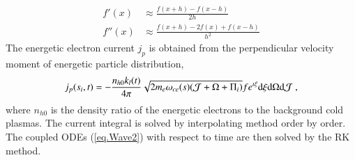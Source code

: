 \begin{equation}
    \begin{aligned}
    f'(x) &\approx \frac{f(x + h) - f(x - h)}{2h}\\
    f''(x) &\approx \frac{f(x + h) - 2f(x) + f(x - h)}{h^2}
    \end{aligned}
\end{equation}
The energetic electron
current $j_p$ is obtained from the perpendicular velocity moment of energetic particle distribution,
\begin{equation}
    j_p(s_i,t) = - \frac{n_{h0}k_l(t)}{4\pi}\iiint \sqrt{2m_e\omega_{ce}(s)(\mathcal{J}+\Omega+\Pi_i)}f e^{\imath \xi} \rm d \xi \rm d \Omega \rm d \mathcal{J}~,
\end{equation}
where $n_{h0}$ is the density ratio of the energetic electrons to the background cold plasmas.
The current integral is solved by interpolating method order by order.
The coupled ODEs (\ref{eq.Wave2}) with respect to time  
are then solved by the RK method. 



